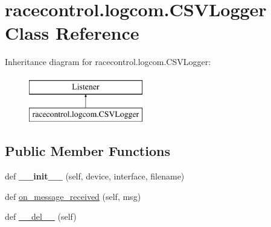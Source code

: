 \hypertarget{classracecontrol_1_1logcom_1_1CSVLogger}{}\section{racecontrol.\+logcom.\+C\+S\+V\+Logger Class Reference}
\label{classracecontrol_1_1logcom_1_1CSVLogger}
Inheritance diagram for racecontrol.\+logcom.\+C\+S\+V\+Logger\+:\begin{figure}[H]
\begin{center}
\leavevmode
\includegraphics[height=2.000000cm]{classracecontrol_1_1logcom_1_1CSVLogger}
\end{center}
\end{figure}
\subsection*{Public Member Functions}
\begin{DoxyCompactItemize}
\item 
def {\bfseries \+\_\+\+\_\+init\+\_\+\+\_\+} (self, device, interface, filename)\hypertarget{classracecontrol_1_1logcom_1_1CSVLogger_a9c2aeb6deff0ce6f9543c8f56b02d684}{}\label{classracecontrol_1_1logcom_1_1CSVLogger_a9c2aeb6deff0ce6f9543c8f56b02d684}

\item 
def \hyperlink{classracecontrol_1_1logcom_1_1CSVLogger_aa707d38f31fff151568318af99cc4235}{on\+\_\+message\+\_\+received} (self, msg)
\item 
def \hyperlink{classracecontrol_1_1logcom_1_1CSVLogger_a096f839011bd342fdf239a767d07f384}{\+\_\+\+\_\+del\+\_\+\+\_\+} (self)
\end{DoxyCompactItemize}
